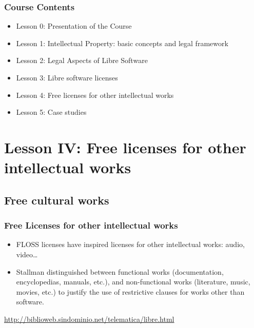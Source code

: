 

\begin{frame}
  \frametitle{Course Contents}

  \begin{itemize}
    \item Lesson 0: Presentation of the Course
    \item Lesson 1: Intellectual Property: basic concepts and legal framework
    \item Lesson 2: Legal Aspects of Libre Software
    \item Lesson 3: Libre software licenses
    \item \alert{Lesson 4: Free licenses for other intellectual works}
    \item Lesson 5: Case studies
  \end{itemize}

\end{frame}


\section{Lesson IV: Free licenses for other intellectual works}

\subsection{Free cultural works}

\begin{frame}
\frametitle{Free Licenses for other intellectual works}

\begin{itemize}
\item FLOSS licenses have inspired licenses for other intellectual
  works: audio, video\ldots 

\item Stallman distinguished between \alert{functional works} (documentation, encyclopedias, manuals, etc.), and \alert{non-functional works} (literature, music, movies, etc.) to justify the use of restrictive clauses for works other than software.\\\pause

\end{itemize}


\footnotesize{\url{http://biblioweb.sindominio.net/telematica/libre.html}}

\end{frame}

